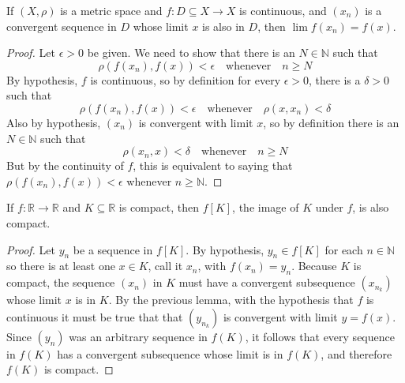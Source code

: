 \begin{lemma*}
If $(X,\rho)$ is a metric space and $f:D\subseteq X\rightarrow X$ is continuous, and $(x_n)$ is a convergent sequence in $D$ whose limit $x$ is also in $D$, then $\lim f(x_n)=f(x)$.
\end{lemma*}
\begin{proof}
Let $\epsilon>0$ be given.  We need to show that there is an $N\in\mathbb{N}$ such that
\[
\rho(f(x_n),f(x))<\epsilon\quad\mbox{whenever}\quad n\geq N
\]
By hypothesis, $f$ is continuous, so by definition for every $\epsilon>0$, there is a $\delta>0$ such that
\[
\rho(f(x_n),f(x))<\epsilon\quad\mbox{whenever}\quad\rho(x,x_n)<\delta
\]
Also by hypothesis, $(x_n)$ is convergent with limit $x$, so by definition there is an $N\in\mathbb{N}$ such that 
\[
\rho(x_n,x)<\delta\quad\mbox{whenever}\quad n\geq N
\]
But by the continuity of $f$, this is equivalent to saying that $\rho(f(x_n),f(x))<\epsilon$ whenever $n\geq\mathbb{N}$.
\end{proof}
\par\vspace{1 cm}
\begin{theorem*} If $f:\mathbb{R}\rightarrow\mathbb{R}$ and $K\subseteq\mathbb{R}$ is compact, then $f[K]$, the image of $K$ under $f$, is also compact.
\end{theorem*}
\begin{proof}
Let $y_n$ be a sequence in $f[K]$.  By hypothesis, $y_n\in f[K]$ for each $n\in\mathbb{N}$ so there is at least one $x\in K$, call it $x_n$, with $f(x_n)=y_n$.  Because $K$ is compact, the sequence $(x_n)$ in $K$ must have a convergent subsequence $(x_{n_k})$ whose limit $x$ is in $K$. By the previous lemma, with the hypothesis that $f$ is continuous it must be true that that $(y_{n_k})$ is convergent with limit $y=f(x)$.  Since $(y_n)$ was an arbitrary sequence in $f(K)$, it follows that every sequence in $f(K)$ has a convergent subsequence whose limit is in $f(K)$, and therefore $f(K)$ is compact.     
\end{proof}

